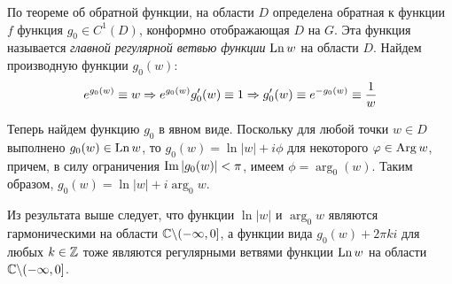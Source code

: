 \begin{example}
\begin{center}
	\end{center}
	
	По теореме об обратной функции, на области $D$ определена обратная к функции $f$ функция $g_0 \in C^1(D)$, конформно отображающая $D$ на $G$. Эта функция называется \textit{главной регулярной ветвью функции} $\operatorname{Ln}{w}$ на области $D$. Найдем производную функции $g_0(w)$:
	\[e^{g_0(w)} \equiv w \Rightarrow e^{g_0(w)}g_0'(w) \equiv 1 \Rightarrow g_0'(w) \equiv e^{-g_0(w)} \equiv \frac{1}{w}\]
	
	Теперь найдем функцию $g_0$ в явном виде. Поскольку для любой точки $w \in D$ выполнено $g_0(w) \in \operatorname{Ln}{w}$, то $g_0(w) = \ln|w| + i\phi$ для некоторого $\varphi \in \operatorname{Arg}{w}$, причем, в силу ограничения $\operatorname{Im}|g_0(w)| < \pi$, имеем $\phi = \arg_0(w)$. Таким образом, $g_0(w) = \ln|w| + i\arg_0{w}$.
\end{example}

\begin{note}
	Из результата выше следует, что функции $\ln|w|$ и $\arg_0w$ являются гармоническими на области $\mathbb{C} \backslash (-\infty, 0]$, а функции вида $g_0(w) + 2\pi k i$ для любых $k \in \mathbb{Z}$ тоже являются регулярными ветвями функции $\operatorname{Ln}{w}$ на области $\mathbb{C} \backslash (-\infty, 0]$.
\end{note}

